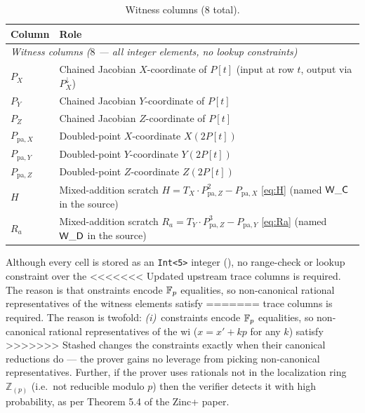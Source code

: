 \begin{table}[h]
\centering\small
\begin{tabular}{ll}
\toprule
\textbf{Column} & \textbf{Role} \\
\midrule
\multicolumn{2}{l}{\textit{Witness columns ($8$ — all integer elements, no lookup constraints)}} \\[1pt]
$P_X$  & Chained Jacobian $X$-coordinate of $P[t]$ \quad (input at row $t$, output via $P_X^{\downarrow}$) \\
$P_Y$  & Chained Jacobian $Y$-coordinate of $P[t]$ \\
$P_Z$  & Chained Jacobian $Z$-coordinate of $P[t]$ \\
$P_{\mathrm{pa},X}$ & Doubled-point $X$-coordinate $X(2 P[t])$ \\
$P_{\mathrm{pa},Y}$ & Doubled-point $Y$-coordinate $Y(2 P[t])$ \\
$P_{\mathrm{pa},Z}$ & Doubled-point $Z$-coordinate $Z(2 P[t])$ \\
$H$    & Mixed-addition scratch $H = T_X \cdot P_{\mathrm{pa},Z}^2 - P_{\mathrm{pa},X}$ \eqref{eq:H} \quad (named $\mathsf{W\_C}$ in the source) \\
$R_a$  & Mixed-addition scratch $R_a = T_Y \cdot P_{\mathrm{pa},Z}^3 - P_{\mathrm{pa},Y}$ \eqref{eq:Ra} \quad (named $\mathsf{W\_D}$ in the source) \\
\bottomrule
\end{tabular}
\caption{Witness columns ($8$ total).}
\label{tab:wit-cols}
\end{table}

\begin{remark}\label{rem:no-range}
Although every cell is stored as an \texttt{Int<5>} integer
(), no range-check or lookup constraint over the
<<<<<<< Updated upstream
trace columns is required. The reason is that onstraints encode $\mathbb{F}_p$ equalities, so non-canonical
rational representatives of the witness elements satisfy
=======
trace columns is required. The reason is twofold:
\emph{(i)}~constraints encode $\mathbb{F}_p$ equalities, so non-canonical
rational representatives of the wi ($x = x' + kp$ for any $k$) satisfy
>>>>>>> Stashed changes
the constraints exactly when their canonical reductions do — the
prover gains no leverage from picking non-canonical representatives. Further, if the prover uses rationals not in the localization ring $\mathbb{Z}_{(p)}$ (i.e.\ not reducible modulo $p$) then the verifier detects it with high probability, as per Theorem 5.4 of the Zinc+ paper.
\end{remark}

